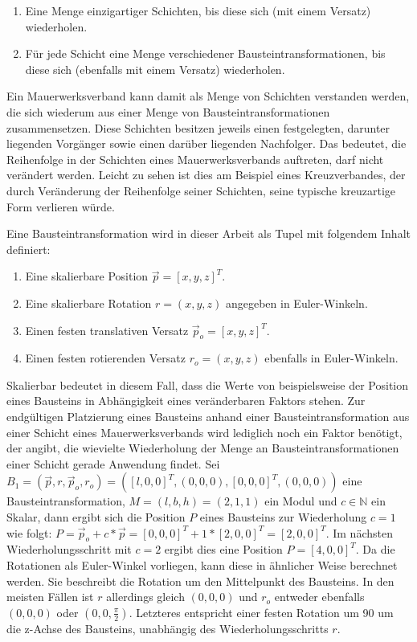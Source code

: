 \begin{enumerate}
    \item Eine Menge einzigartiger Schichten, bis diese sich (mit einem Versatz) wiederholen.
    \item Für jede Schicht eine Menge verschiedener Bausteintransformationen, bis diese sich (ebenfalls mit einem Versatz) wiederholen.
\end{enumerate}

Ein Mauerwerksverband kann damit als Menge von Schichten verstanden werden, die sich wiederum aus einer Menge von Bausteintransformationen zusammensetzen.
Diese Schichten besitzen jeweils einen festgelegten, darunter liegenden Vorgänger sowie einen darüber liegenden Nachfolger.
Das bedeutet, die Reihenfolge in der Schichten eines Mauerwerksverbands auftreten, darf nicht verändert werden.
Leicht zu sehen ist dies am Beispiel eines Kreuzverbandes, der durch Veränderung der Reihenfolge seiner Schichten, seine typische kreuzartige Form verlieren würde.

Eine Bausteintransformation wird in dieser Arbeit als Tupel mit folgendem Inhalt definiert:

\begin{enumerate}
    \item Eine skalierbare Position \(\vec{p} = {[x, y, z]}^T\).
    \item Eine skalierbare Rotation \(r = (x, y, z)\) angegeben in Euler-Winkeln.
    \item Einen festen translativen Versatz \(\vec{p}_o = {[x, y, z]}^T\).
    \item Einen festen rotierenden Versatz \(r_o = (x, y, z)\) ebenfalls in Euler-Winkeln.
\end{enumerate}

Skalierbar bedeutet in diesem Fall, dass die Werte von beispielsweise der Position eines Bausteins in Abhängigkeit eines veränderbaren Faktors stehen.
Zur endgültigen Platzierung eines Bausteins anhand einer Bausteintransformation aus einer Schicht eines Mauerwerksverbands wird lediglich noch ein Faktor benötigt, der angibt, die wievielte Wiederholung der Menge an Bausteintransformationen einer Schicht gerade Anwendung findet.
Sei \(B_1 = (\vec{p}, r, \vec{p}_o, r_o) = ({[l, 0, 0]}^T, (0, 0, 0), {[0, 0, 0]}^T, (0, 0, 0))\) eine Bausteintransformation, \(M = (l, b, h) = (2, 1, 1)\) ein Modul und \(c\in\mathbb{N}\) ein Skalar,
dann ergibt sich die Position \(P\) eines Bausteins zur Wiederholung \(c = 1\) wie folgt: \(P = \vec{p}_o + c * \vec{p} = {[0, 0, 0]}^T + 1 * {[2, 0, 0]}^T = {[2, 0, 0]}^T\).
Im nächsten Wiederholungsschritt mit \(c = 2\) ergibt dies eine Position \(P = {[4, 0, 0]}^T\).
Da die Rotationen als Euler-Winkel vorliegen, kann diese in ähnlicher Weise berechnet werden.
Sie beschreibt die Rotation um den Mittelpunkt des Bausteins.
In den meisten Fällen ist \(r\) allerdings gleich \((0, 0, 0)\) und \(r_o\) entweder ebenfalls \((0, 0, 0)\) oder \((0, 0, \frac{\pi}{2})\).
Letzteres entspricht einer festen Rotation um 90\degree{} um die z-Achse des Bausteins, unabhängig des Wiederholungsschritts \(r\).

